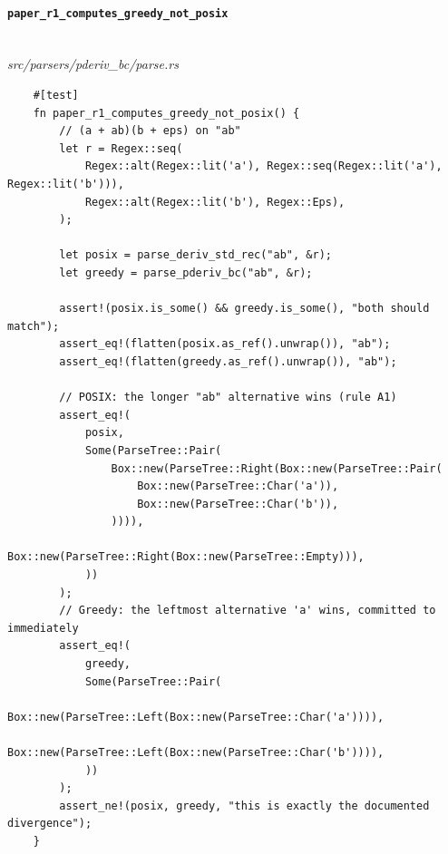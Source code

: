 \paragraph{\texttt{paper\_r1\_computes\_greedy\_not\_posix}}\ \\[-0.4em]
\textit{\small src/parsers/pderiv\_bc/parse.rs}
{\scriptsize\begin{verbatim}
    #[test]
    fn paper_r1_computes_greedy_not_posix() {
        // (a + ab)(b + eps) on "ab"
        let r = Regex::seq(
            Regex::alt(Regex::lit('a'), Regex::seq(Regex::lit('a'), Regex::lit('b'))),
            Regex::alt(Regex::lit('b'), Regex::Eps),
        );

        let posix = parse_deriv_std_rec("ab", &r);
        let greedy = parse_pderiv_bc("ab", &r);

        assert!(posix.is_some() && greedy.is_some(), "both should match");
        assert_eq!(flatten(posix.as_ref().unwrap()), "ab");
        assert_eq!(flatten(greedy.as_ref().unwrap()), "ab");

        // POSIX: the longer "ab" alternative wins (rule A1)
        assert_eq!(
            posix,
            Some(ParseTree::Pair(
                Box::new(ParseTree::Right(Box::new(ParseTree::Pair(
                    Box::new(ParseTree::Char('a')),
                    Box::new(ParseTree::Char('b')),
                )))),
                Box::new(ParseTree::Right(Box::new(ParseTree::Empty))),
            ))
        );
        // Greedy: the leftmost alternative 'a' wins, committed to immediately
        assert_eq!(
            greedy,
            Some(ParseTree::Pair(
                Box::new(ParseTree::Left(Box::new(ParseTree::Char('a')))),
                Box::new(ParseTree::Left(Box::new(ParseTree::Char('b')))),
            ))
        );
        assert_ne!(posix, greedy, "this is exactly the documented divergence");
    }
\end{verbatim}}


